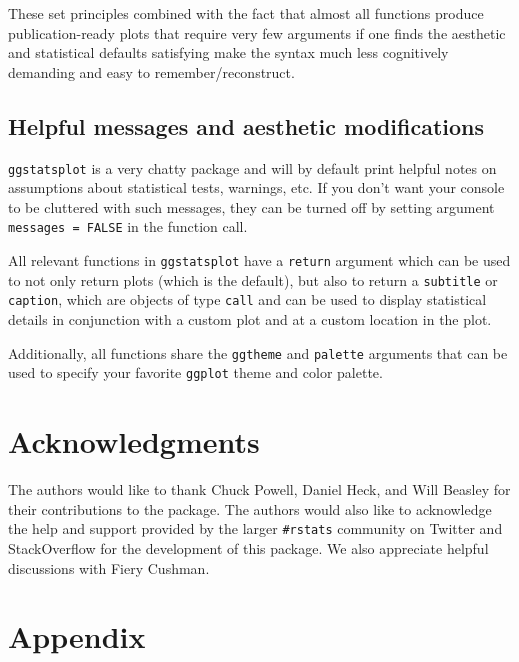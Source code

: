 \documentclass[]{article}
\begin{document}
These set principles combined with the fact that almost all functions produce
publication-ready plots that require very few arguments if one finds the
aesthetic and statistical defaults satisfying make the syntax much less
cognitively demanding and easy to remember/reconstruct.

\hypertarget{helpful-messages-and-aesthetic-modifications}{%
\subsection{Helpful messages and aesthetic modifications}\label{helpful-messages-and-aesthetic-modifications}}

\texttt{ggstatsplot} is a very chatty package and will by default print helpful notes
on assumptions about statistical tests, warnings, etc. If you don't want your
console to be cluttered with such messages, they can be turned off by setting
argument \texttt{messages\ =\ FALSE} in the function call.

All relevant functions in \texttt{ggstatsplot} have a \texttt{return} argument which can be
used to not only return plots (which is the default), but also to return a
\texttt{subtitle} or \texttt{caption}, which are objects of type \texttt{call} and can be used to
display statistical details in conjunction with a custom plot and at a custom
location in the plot.

Additionally, all functions share the \texttt{ggtheme} and \texttt{palette} arguments that can
be used to specify your favorite \texttt{ggplot} theme and color palette.

\hypertarget{acknowledgments}{%
\section{Acknowledgments}\label{acknowledgments}}

The authors would like to thank Chuck Powell, Daniel Heck, and Will Beasley for
their contributions to the package. The authors would also like to acknowledge
the help and support provided by the larger \texttt{\#rstats} community on Twitter and
StackOverflow for the development of this package. We also appreciate helpful
discussions with Fiery Cushman.

\newpage

\hypertarget{appendix}{%
\section{Appendix}\label{appendix}}
\end{document}

